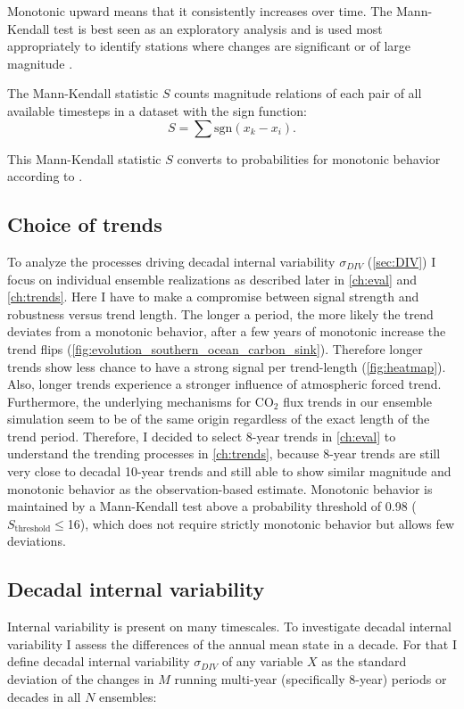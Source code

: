 Monotonic upward means that it consistently increases over time. The Mann-Kendall test is best seen as an exploratory analysis and is used most appropriately to identify stations where changes are significant or of large magnitude \citep{Hirsch1982}.

The Mann-Kendall statistic $S$ counts magnitude relations of each pair of all available timesteps in a dataset with the sign function: 
\[ S= \sum \text{sgn} \left( x_k - x_i \right). \]

This Mann-Kendall statistic $S$ converts to probabilities for monotonic behavior according to \cite{Gilbert1987}.

\subsection{Choice of trends} 
\label{sec:choicetrend}
To analyze the processes driving decadal internal variability $\sigma_{DIV}$ (\autoref{sec:DIV}) I focus on individual ensemble realizations as described later in \autoref{ch:eval} and \ref{ch:trends}. Here I have to make a compromise between signal strength and robustness versus trend length. The longer a period, the more likely the trend deviates from a monotonic behavior, \eg after a few years of monotonic increase the trend flips (\autoref{fig:evolution_southern_ocean_carbon_sink}). Therefore longer trends show less chance to have a strong signal per trend-length (\autoref{fig:heatmap}). Also, longer trends experience a stronger influence of atmospheric forced trend. Furthermore, the underlying mechanisms for CO$_2$ flux trends in our ensemble simulation seem to be of the same origin regardless of the exact length of the trend period. Therefore, I decided to select 8-year trends in \autoref{ch:eval} to understand the trending processes in \autoref{ch:trends}, because 8-year trends are still very close to decadal 10-year trends and still able to show similar magnitude and monotonic behavior as the observation-based estimate. 
Monotonic behavior is maintained by a Mann-Kendall test above a probability threshold of 0.98 ($S_{\text{threshold}} \leq$16), which does not require strictly monotonic behavior but allows few deviations.

\subsection{Decadal internal variability}
\label{sec:DIV}
Internal variability is present on many timescales. To investigate decadal internal variability I assess the differences of the annual mean state in a decade. For that I define decadal internal variability $\sigma_{DIV}$ of any variable $X$ as the standard deviation of the changes in $M$ running multi-year (specifically 8-year) periods or decades in all $N$ ensembles:

